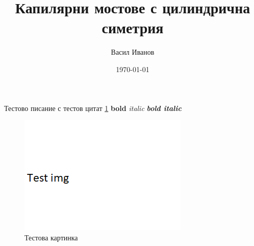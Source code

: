 \documentclass[12pt]{article}
\title{Капилярни мостове с цилиндрична симетрия}
\author{Васил Иванов }
\date{\today}
\begin{document}
    Тестово писание с тестов цитат
    \cite{directSynth}\ref{Fig1}
    \textbf{bold}
    \textit{italic}
    \textbf{\textit{bold italic}}
    \begin{figure}
        \centering
        \includegraphics[width=0.5\linewidth]{imgs/test.png}
        \caption{Тестова картинка}
        \label{Fig1}
    \end{figure}
    \printbibliography
\end{document}
